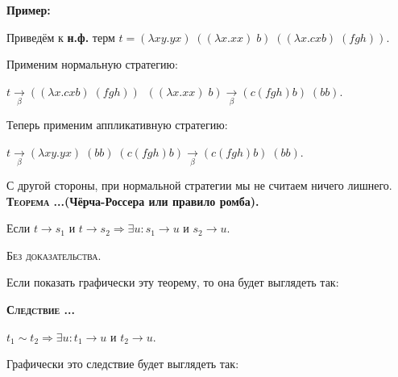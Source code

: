 \documentclass[18pt, a4paper]{extarticle}
\newcounter{par}
\newcounter{spar}
\newcounter{zap}
\newcommand{\sled}{\textbf{\textsc{Следствие \thepar.\if\thespar1\thespar.\fi\thezap.\;}}\stepcounter{zap}}
\newcommand{\teorT}[1]{\textbf{\textsc{Теорема \thepar.\if\thespar1\thespar.\fi\thezap.}(#1).}\stepcounter{zap}}
\newcommand{\primer}{\textbf{Пример:\;}}
\newcommand{\bezdok}{\textsc{Без доказательства.}}
\newcommand{\lm}{\lambda}
\newcommand{\redb}{\underset{\beta}{\longrightarrow}}
\begin{document}
\primer

Приведём к \textbf{н.ф.} терм $t=(\lm xy.yx)\;((\lm x.xx)\;b)\;((\lm x.cxb)\;(fgh))$.

Применим нормальную стратегию:

$t\redb((\lm x.cxb)\;(fgh))\;\;((\lm x.xx)\;b)\redb(c(fgh)b)\;(bb)$.

Теперь применим аппликативную стратегию:

$t\redb(\lm xy.yx)\;(bb)\;(c(fgh)b)\redb(c(fgh)b)\;(bb)$.

С другой стороны, при нормальной стратегии мы не считаем ничего лишнего.\\

\teorT{Чёрча-Россера или правило ромба}

Если $t\to s_1$ и $t\to s_2\Rightarrow\exists u\!:s_1\to u$ и $s_2\to u$.

\bezdok

Если показать графически эту теорему, то она будет выглядеть так:
\begin{center}
\end{center}

\newpage

\sled

$t_1\sim t_2\Rightarrow\exists u\!:t_1\to u$ и $t_2\to u$.

Графически это следствие будет выглядеть так:
\end{document}

